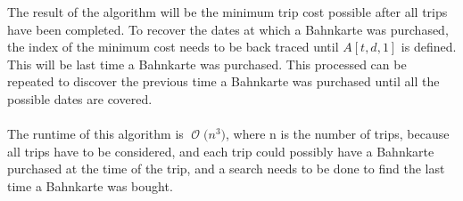 \documentclass[12pt]{article}
\newcommand{\BigO}[1]{\ensuremath{\operatorname{\mathcal{O}}\bigl(#1\bigr)}}
\begin{document}
The result of the algorithm will be the minimum trip cost possible after
all trips have been completed.  To recover the dates at which a Bahnkarte
was purchased, the index of the minimum cost needs to be back traced
until $A[t,d,1]$ is defined.  This will be last time a Bahnkarte was 
purchased.  This processed can be repeated to discover the previous 
time a Bahnkarte was purchased until all the possible dates are covered.\\\\
The runtime of this algorithm is \BigO{n^3}, where n is the number of trips, because all trips have to be
considered, and each trip could possibly have a Bahnkarte purchased at
the time of the trip, and a search needs to be done to find the last
time a Bahnkarte was bought.
\end{document}
